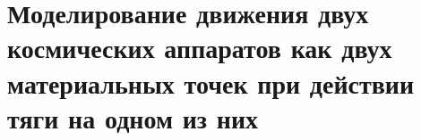 \section{Моделирование движения двух космических аппаратов как двух материальных точек при действии тяги на одном из них}
\label{SEC:2SPH}